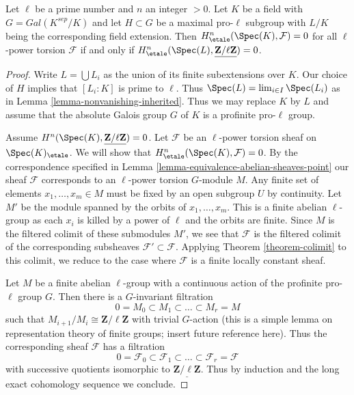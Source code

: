 \begin{lemma}
\label{lemma-reduce-to-l-group}
Let $\ell$ be a prime number and $n$ an integer $> 0$.
Let $K$ be a field with $G = Gal(K^{sep}/K)$ and let
$H \subset G$ be a maximal pro-$\ell$ subgroup with $L/K$
being the corresponding field extension. Then
$H^n_\etale(\Spec(K), \mathcal{F}) = 0$ for all
$\ell$-power torsion $\mathcal{F}$ if and only if
$H^n_\etale(\Spec(L), \underline{\mathbf{Z}/\ell\mathbf{Z}}) = 0$.
\end{lemma}

\begin{proof}
Write $L = \bigcup L_i$ as the union of its finite subextensions over $K$.
Our choice of $H$ implies that $[L_i : K]$ is prime to $\ell$.
Thus $\Spec(L) = \lim_{i \in I} \Spec(L_i)$ as in
Lemma \ref{lemma-nonvanishing-inherited}.
Thus we may replace $K$ by $L$ and assume that
the absolute Galois group $G$ of $K$ is a
profinite pro-$\ell$ group.

\medskip\noindent
Assume $H^n(\Spec(K), \underline{\mathbf{Z}/\ell\mathbf{Z}}) = 0$.
Let $\mathcal{F}$ be an $\ell$-power torsion sheaf on $\Spec(K)_\etale$.
We will show that $H^n_\etale(\Spec(K), \mathcal{F}) = 0$.
By the correspondence specified in
Lemma \ref{lemma-equivalence-abelian-sheaves-point}
our sheaf $\mathcal{F}$ corresponds to an $\ell$-power torsion
$G$-module $M$. Any finite set of elements $x_1, \ldots, x_m \in M$
must be fixed by an open subgroup $U$ by continuity.
Let $M'$ be the module spanned by the orbits of $x_1, \ldots, x_m$.
This is a finite abelian $\ell$-group
as each $x_i$ is killed by a power of $\ell$
and the orbits are finite. Since $M$ is the filtered colimit of
these submodules $M'$, we see that $\mathcal{F}$ is the filtered
colimit of the corresponding subsheaves $\mathcal{F}' \subset \mathcal{F}$.
Applying Theorem \ref{theorem-colimit} to this colimit, we reduce
to the case where $\mathcal{F}$ is a finite locally constant sheaf.

\medskip\noindent
Let $M$ be a finite abelian $\ell$-group with a continuous action
of the profinite pro-$\ell$ group $G$. Then there is a $G$-invariant
filtration
$$
0 = M_0 \subset M_1 \subset \ldots \subset M_r = M
$$
such that $M_{i + 1}/M_i \cong \mathbf{Z}/\ell \mathbf{Z}$ with
trivial $G$-action (this is a simple lemma on representation
theory of finite groups; insert future reference here).
Thus the corresponding sheaf $\mathcal{F}$ has a filtration
$$
0 = \mathcal{F}_0 \subset \mathcal{F}_1 \subset \ldots \subset
\mathcal{F}_r = \mathcal{F}
$$
with successive quotients isomorphic to
$\underline{\mathbf{Z}/\ell \mathbf{Z}}$.
Thus by induction and the long exact cohomology
sequence we conclude.
\end{proof}

